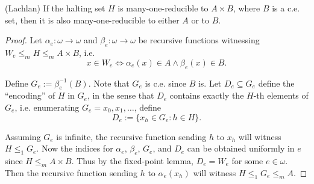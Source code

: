 \begin{theorem}
  (Lachlan) If the halting set $H$ is many-one-reducible to $A\times B$,
  where $B$ is a c.e. set, then it is also many-one-reducible to either $A$
  or to $B$.
\end{theorem}
\begin{proof}
  Let $\alpha_e:\omega \rightarrow\omega$ and $\beta_e:\omega
  \rightarrow\omega$ be recursive functions witnessing $W_e\leq_m H\leq_m
  A\times B$, i.e.
  \[x\in W_e \Leftrightarrow \alpha_e(x)\in A \wedge \beta_e(x)\in B.\]

  Define $G_e:=\beta_e^{-1}(B)$. Note that $G_e$ is c.e. since $B$ is. Let
  $D_e\subseteq G_e$ define the ``encoding'' of $H$ in $G_e$, in the sense
  that $D_e$ contains exactly the $H$-th elements of $G_e$, i.e.
  enumerating $G_e = x_0,x_1,\ldots$, define
  \[D_e :=\{x_h\in G_e: h\in H\}.\]

  Assuming $G_e$ is infinite, the recursive function sending $h$ to
  $x_h$ will witness $H\leq_1G_e$. Now the indices for $\alpha_e$,
  $\beta_e$, $G_e$, and $D_e$ can be obtained uniformly in $e$ since
  $H\leq_m A\times B$. Thus by the fixed-point lemma, $D_e=W_e$ for some
  $e\in\omega$. Then the recursive function sending $h$ to $\alpha_e(x_h)$
  will witness $H\leq_1 G_e\leq_m A$.
\end{proof}
